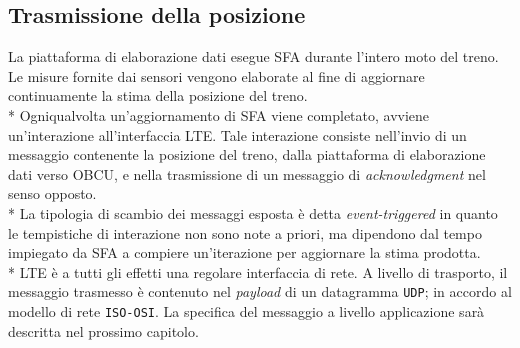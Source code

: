 	\subsection{Trasmissione della posizione}
	La piattaforma di elaborazione dati esegue SFA durante l'intero moto del treno. Le misure fornite dai sensori vengono elaborate al fine di aggiornare continuamente la stima della posizione del treno.\\*
	Ogniqualvolta un'aggiornamento di SFA viene completato, avviene un'interazione all'interfaccia LTE. Tale interazione consiste nell'invio di un messaggio contenente la posizione del treno, dalla piattaforma di elaborazione dati verso OBCU, e nella trasmissione di un messaggio di \emph{acknowledgment} nel senso opposto.\\*
	La tipologia di scambio dei messaggi esposta \`e detta \emph{event-triggered} \cite{evttimetriggered} in quanto le tempistiche di interazione non sono note a priori, ma dipendono dal tempo impiegato da SFA a compiere un'iterazione per aggiornare la stima prodotta.\\*
	LTE \`e a tutti gli effetti una regolare interfaccia di rete. A livello di trasporto, il messaggio trasmesso \`e contenuto nel \emph{payload} di un datagramma \texttt{UDP}; in accordo al modello di rete \texttt{ISO-OSI}. \cite{libroreti} La specifica del messaggio a livello applicazione sar\`a descritta nel prossimo capitolo.
